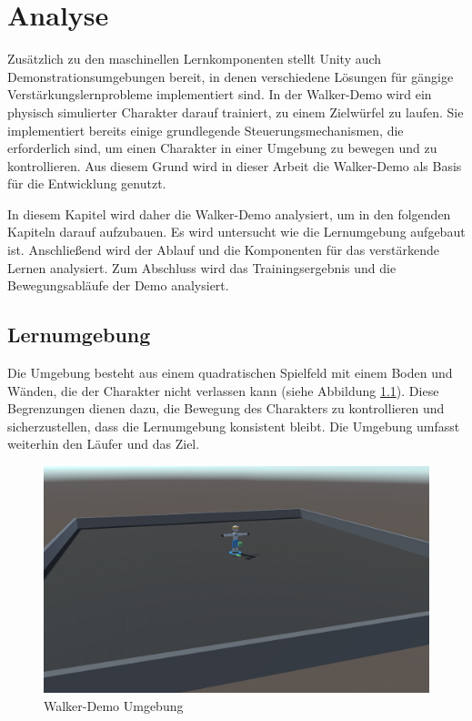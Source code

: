 \chapter{Analyse}
\label{sec:analyse}
Zusätzlich zu den maschinellen Lernkomponenten stellt Unity auch Demonstrationsumgebungen bereit, in denen verschiedene Lösungen für gängige Verstärkungslernprobleme implementiert sind. In der Walker-Demo wird ein physisch simulierter Charakter darauf trainiert, zu einem Zielwürfel zu laufen. Sie implementiert bereits einige grundlegende Steuerungsmechanismen, die erforderlich sind, um einen Charakter in einer Umgebung zu bewegen und zu kontrollieren. Aus diesem Grund wird in dieser Arbeit die Walker-Demo als Basis für die Entwicklung genutzt. 

In diesem Kapitel wird daher die Walker-Demo analysiert, um in den folgenden Kapiteln darauf aufzubauen. Es wird untersucht wie die Lernumgebung aufgebaut ist. Anschließend wird der Ablauf und die Komponenten für das verstärkende Lernen analysiert. Zum Abschluss wird das Trainingsergebnis und die Bewegungsabläufe der Demo analysiert.
\section{Lernumgebung}
Die Umgebung besteht aus einem quadratischen Spielfeld mit einem Boden und Wänden, die der Charakter nicht verlassen kann (siehe Abbildung \ref{fig:walker_aufbau}). Diese Begrenzungen dienen dazu, die Bewegung des Charakters zu kontrollieren und sicherzustellen, dass die Lernumgebung konsistent bleibt. Die Umgebung umfasst weiterhin den Läufer und das Ziel.

\begin{figure}[H]
  \centering  
  \includegraphics[scale=0.35]{img/walker_aufbau.png}
  \caption{Walker-Demo Umgebung}
  \label{fig:walker_aufbau}
\end{figure}

